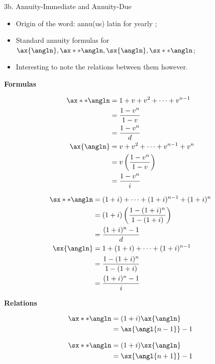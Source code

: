 \begin{CHPT_SUMM_AUTO}[label = {L.-3b}]{3b. Annuity-Immediate and Annuity-Due}
	\begin{itemize}
		\item	Origin of the word: annu(us) latin for \og yearly \fg{};
		\item	Standard annuity formulas for $\ax{\angln}, \ax**{\angln}, \sx{\angln}, \sx**{\angln}$;
		\item	Interesting to note the relations between them however.
	\end{itemize}
\setlength{\mathindent}{-1cm}

\textbf{Formulas}
	\begin{minipage}[ht]{0.4\linewidth}
	\begin{align*}
	\ax**{\angln}	
	&=	1 + v + v^{2} + \dots + v^{n - 1}	\\
	&=	\frac{1 - v^{n}}{1 - v}	\\
	&=	\frac{1 - v^{n}}{d}	\\
	\ax{\angln}	
	&=	v + v^{2} + \dots + v^{n - 1} + v^{n}	\\
	&=	v\left(\frac{1 - v^{n}}{1 - v}\right)	\\
	&=	\frac{1 - v^{n}}{i}	
	\end{align*}	
	\end{minipage}
	\begin{minipage}[ht]{0.6\linewidth}
		\begin{align*}
	\sx**{\angln}	
	&=	(1 + i) + \dots + (1 + i)^{n - 1} + (1 + i)^{n}	\\	
	&=	(1 + i)\left(\frac{1 - (1 + i)^{n}}{1 - (1 + i)}\right)	\\
	&=	\frac{(1 + i)^{n} - 1}{d}	\\
	\sx{\angln}	
	&=	1 + (1 + i) + \dots + (1 + i)^{n - 1}	\\
	&=	\frac{1 - (1 + i)^{n}}{1 - (1 + i)}	\\
	&=	\frac{(1 + i)^{n} - 1}{i}	
	\end{align*}
	\end{minipage}

\textbf{Relations}
	\begin{minipage}[ht]{0.5\linewidth}
	\begin{align*}
	\ax**{\angln}	
	&=	(1 + i) \ax{\angln}	\\
	&=	\ax{\angl{n - 1}} - 1
	\end{align*}	
	\end{minipage}
	\begin{minipage}[ht]{0.5\linewidth}
		\begin{align*}
	\sx**{\angln}	
	&=	(1 + i) \sx{\angln}	\\
	&=	\sx{\angl{n + 1}} - 1	
	\end{align*}
	\end{minipage}
	\setlength{\mathindent}{1cm}
\end{CHPT_SUMM_AUTO}

